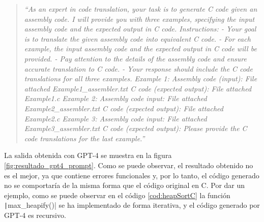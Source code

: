 \begin{quote}
    \textit{``As an expert in code translation, your task is to generate C code given
    an assembly code. I will provide you with three examples, specifying the input
    assembly code and the expected output in C code.\newline \newline
    Instructions:\newline
    - Your goal is to translate the given assembly code into equivalent C code.\newline
    - For each example, the input assembly code and the expected output in C code will be provided.\newline
    - Pay attention to the details of the assembly code and ensure accurate translation to C code.\newline
    - Your response should include the C code translations for all three examples.\newline \newline
    Example 1:\newline
    Assembly code (input):\newline
    File attached Example1\_assembler.txt\newline
    C code (expected output):\newline
    File attached Example1.c\newline \newline
    Example 2:\newline
    Assembly code input:\newline
    File attached Example2\_assembler.txt\newline
    C code (expected output):\newline
    File attached Example2.c\newline \newline
    Example 3:\newline
    Assembly code input:\newline
    File attached Example3\_assembler.txt\newline
    C code (expected output):\newline \newline
    Please provide the C code translations for the last example.''}
\end{quote}

La salida obtenida con GPT-4 se muestra en la figura \ref{fig:resultado_gpt4_prompt}. Como se puede
observar, el resultado obtenido no es el mejor, ya que contiene errores funcionales y, por lo tanto,
el código generado no se comportaría de la misma forma que el código original en C. Por dar un ejemplo,
como se puede observar en el código \ref{cod:heapSortC} la función \texttt|max_heapify()| se ha
implementado de forma iterativa, y el código generado por GPT-4 es recursivo.

